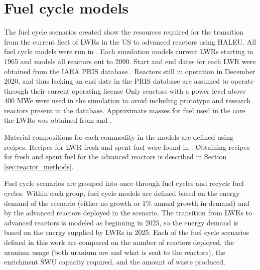 \section{Fuel cycle models}
The fuel cycle scenarios created show the resources required for the transition from the 
current fleet of \glspl{LWR} in the US to advanced reactors using \gls{HALEU}.
All fuel cycle models were run in \Cyclus 
\cite{huff_fundamental_2016}. Each simulation models current 
\glspl{LWR} starting in 1965 and models all reactors out to 2090. Start and 
end dates for each \gls{LWR} were obtained from the \gls{IAEA} \gls{PRIS} database 
\cite{noauthor_power_1989}. Reactors still in operation in December 2020, and thus 
lacking an end date in the \gls{PRIS} database are assumed to operate through their 
current operating license 
\cite{us_nuclear_regulatory_commission_clinton_2021,us_nuclear_regulatory_commission_comanche_2021,us_nuclear_regulatory_commission_comanche_2021-1,us_nuclear_regulatory_commission_perry_2021,us_nuclear_regulatory_commission_watts_2021,us_nuclear_regulatory_commission_watts_2021-1,nuclear_energy_institute_initial_2021,nuclear_energy_institute_second_2021}
Only reactors with a power level above 400 MWe were used in the simulation 
to avoid including prototype and research reactors present in the database. 
Approximate masses for fuel used in the core the \glspl{LWR} was obtained 
from \cite{todreas_nuclear_2012} and \cite{cacuci_handbook_2010}. 

Material compositions for each commodity in the models are defined using recipes.
Recipes for \gls{LWR} fresh and spent fuel were found in \cite{yacout_visionverifiable_2006}.
Obtaining recipes for fresh and spent fuel for the advanced reactors is described in 
Section \ref{sec:reactor_methods}.

Fuel cycle scenarios are grouped into once-through fuel cycles and recycle fuel 
cycles. Within each group, fuel cycle models are defined based on the energy demand 
of the scenario (either no growth or 1\% annual growth in demand) and by the 
advanced reactors deployed in the scenario. The transition from \glspl{LWR} to 
advanced reactors is modeled as beginning in 2025, so the energy demand is based on the 
energy supplied by \glspl{LWR} in 2025. Each of the fuel cycle scenarios 
defined in this work are compared on the number of reactors deployed, the 
uranium usage (both uranium ore and what is sent to the reactors), the enrichment 
\gls{SWU} capacity required, and the amount of waste produced. 

